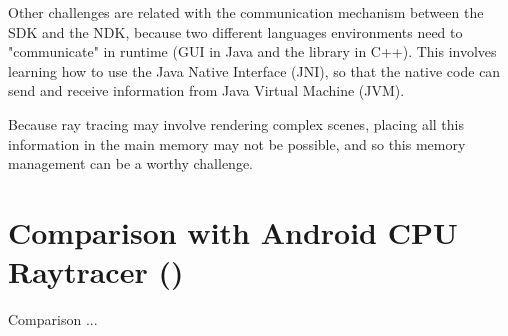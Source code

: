 \par
Other challenges are related with the communication mechanism between the SDK and the NDK, because two different languages environments need to "communicate" in runtime (GUI in Java and the library in C++).
This involves learning how to use the Java Native Interface (JNI), so that the native code can send and receive information from Java Virtual Machine (JVM).

\par
Because ray tracing may involve rendering complex scenes, placing all this information in the main memory may not be possible, and so this memory management can be a worthy challenge.

\section{Comparison with Android CPU Raytracer (\cite{Android_CPU_Raytracer})}

\par
Comparison ...